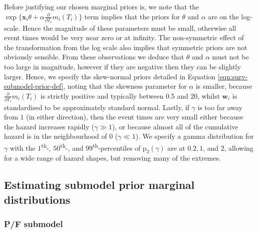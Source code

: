 \documentclass[
  10pt,
  a4paper,
]{article}
\newcommand{\pd}{\text{p}}
\begin{document}
Before justifying our chosen marginal priors is, we note that the
\(\exp\{\boldsymbol{x}_{i}\theta + \alpha \frac{\partial}{\partial T_{i}} m_{i}(T_{i})\}\)
term implies that the priors for \(\theta\) and \(\alpha\) are on the
log-scale. Hence the magnitude of these parameters must be small,
otherwise all event times would be very near zero or at infinity. The
non-symmetric effect of the transformation from the log scale also
implies that symmetric priors are not obviously sensible. From these
observations we deduce that \(\theta\) and \(\alpha\) must not be too
large in magnitude, however if they are negative then they can be
slightly larger. Hence, we specify the skew-normal priors detailed in
Equation \eqref{eqn:surv-submodel-prior-def}, noting that the skewness
parameter for \(\alpha\) is smaller, because
\(\frac{\partial}{\partial T_{i}} m_{i}(T_{i})\) is strictly positive
and typically between 0.5 and 20, whilst \(\boldsymbol{w}_{i}\) is
standardised to be approximately standard normal. Lastly, if \(\gamma\)
is too far away from \(1\) (in either direction), then the event times
are very small either because the hazard increases rapidly
(\(\gamma \gg 1\)), or because almost all of the cumulative hazard is in
the neighbourhood of 0 (\(\gamma \ll 1\)). We specify a gamma
distribution for \(\gamma\) with the \(1\)\textsuperscript{th}-,
\(50\)\textsuperscript{th}-, and \(99\)\textsuperscript{th}-percentiles
of \(\pd_{2}(\gamma)\) are at \(0.2, 1\), and \(2\), allowing for a wide
range of hazard shapes, but removing many of the extremes.

\hypertarget{estimating-submodel-prior-marginal-distributions}{%
\subsection{Estimating submodel prior marginal
distributions}\label{estimating-submodel-prior-marginal-distributions}}

\hypertarget{pf-submodel}{%
\subsubsection{P/F submodel}\label{pf-submodel}}
\end{document}
